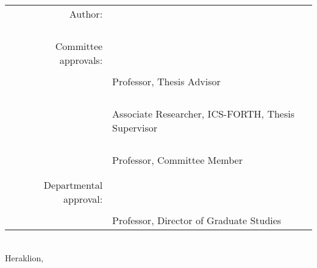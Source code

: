 \begin{titlepage}
\begin{center}
\begin{tabular}{rl}
\\
Author: & \underline{\phantom{123456789012345678901234567890123456789012}}\\
    & \owner{}\\
    \\
    \\
    \\
Committee approvals: & \underline{\phantom{123456789012345678901234567890123456789012}}\\
    & \firstprof{}\\
    & {\small Professor, Thesis Advisor}\\
    \vspace{0.2cm}
    \\
    \\
& \underline{\phantom{123456789012345678901234567890123456789012}}\\
    & \secondprof{}\\
    & {\small Associate Researcher, ICS-FORTH, Thesis Supervisor}\\
    \vspace{0.2cm}
    \\
    \\
& \underline{\phantom{123456789012345678901234567890123456789012}}\\
    & \thirdprof{}\\
    & {\small  Professor, Committee Member}\\
    \vspace{0.2cm}
    \\
    \\
\hspace{1.4ex}Departmental approval: & \underline{\phantom{123456789012345678901234567890123456789012}}\\
    & \chair{}\\
    & {\small  Professor, Director of Graduate Studies}\\
\end{tabular}
\\

\vfill
Heraklion, \thesisdate{}
\end{center}

\thispagestyle{empty}

\end{titlepage}
